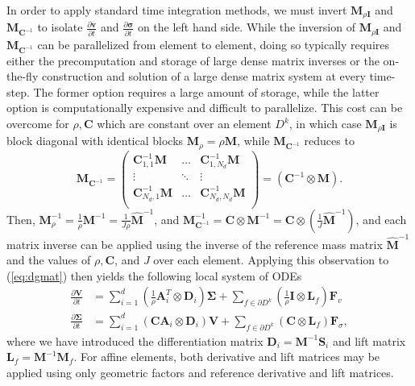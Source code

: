 \documentclass{siamart0216}
\newcommand{\pd}[2]{\frac{\partial#1}{\partial#2}}
\newcommand{\LRp}[1]{\left( #1 \right)}
\begin{document}
In order to apply standard time integration methods, we must invert $\bm{M}_{\rho\bm{I}}$ and $\bm{M}_{\bm{C}^{-1}}$ to isolate $\pd{\bm{v}}{t}$ and $\pd{\bm{\sigma}}{t}$ on the left hand side.  While the inversion of $\bm{M}_{\rho\bm{I}}$ and $\bm{M}_{\bm{C}^{-1}}$ can be parallelized from element to element, doing so typically requires either the precomputation and storage of large dense matrix inverses or the on-the-fly construction and solution of a large dense matrix system at every time-step.  The former option requires a large amount of storage, while the latter option is computationally expensive and difficult to parallelize.  This cost can be overcome for $\rho, \bm{C}$ which are constant over an element $D^k$, in which case $\bm{M}_{\rho\bm{I}}$ is block diagonal with identical blocks $\bm{M}_\rho = \rho\bm{M}$, while $\bm{M}_{\bm{C}^{-1}}$ reduces to
\[
\bm{M}_{\bm{C}^{-1}} = \LRp{\begin{array}{ccc}
\bm{C}_{1,1}^{-1}\bm{M}& \ldots & \bm{C}^{-1}_{1,N_d}\bm{M}\\
\vdots & \ddots & \vdots\\
\bm{C}_{N_d,1}^{-1}\bm{M} & \ldots & \bm{C}^{-1}_{N_d,N_d}\bm{M}\\
\end{array}} 
= \LRp{\bm{C}^{-1}\otimes \bm{M}}.
\]
Then, $\bm{M}^{-1}_\rho = \frac{1}{\rho}\bm{M}^{-1} = \frac{1}{J\rho}\widehat{\bm{M}}^{-1}$, and $\bm{M}^{-1}_{\bm{C}^{-1}} = \bm{C}\otimes \bm{M}^{-1} = \bm{C}\otimes \LRp{\frac{1}{J}\widehat{\bm{M}}^{-1}}$, and each matrix inverse can be applied using the inverse of the reference mass matrix $\widehat{\bm{M}}^{-1}$ and the values of $\rho, \bm{C}$, and $J$ over each element.  Applying this observation to (\ref{eq:dgmat}) then yields the following local system of ODEs 
\begin{align*}
\pd{\bm{V}}{t} &= \sum_{i=1}^d  \LRp{\frac{1}{\rho}\bm{A}_i^T\otimes \bm{D}_{i}} \bm{\Sigma} + \sum_{f\in \partial D^k}\LRp{\frac{1}{\rho}\bm{I}\otimes \bm{L}_f}\bm{F}_{v}\\
\pd{\bm{\Sigma}}{t} &= \sum_{i=1}^d \LRp{\bm{C}\bm{A}_i\otimes \bm{D}_{i}}\bm{V}  +  \sum_{f\in \partial D^k}\LRp{\bm{C}\otimes\bm{L}_f}\bm{F}_{\sigma},
\end{align*}
where we have introduced the differentiation matrix $\bm{D}_i = \bm{M}^{-1}\bm{S}_i$ and lift matrix $\bm{L}_f = \bm{M}^{-1}\bm{M}_f$.  For affine elements, both derivative and lift matrices may be applied using only geometric factors and reference derivative and lift matrices.  
\end{document}
